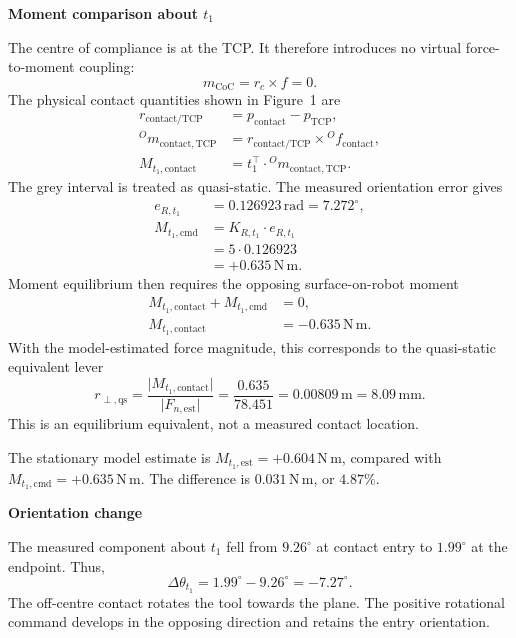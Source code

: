 \documentclass[11pt,a4paper]{article}
\begin{document}
\par\smallskip
\noindent\textbf{Moment comparison about \(t_1\)}\par
The centre of compliance is at the TCP.  It therefore introduces no virtual
force-to-moment coupling:
\[
 m_{\mathrm{CoC}}=r_c\times f=0.
\]
The physical contact quantities shown in Figure~1 are
\[
 \begin{aligned}
 r_{\mathrm{contact/TCP}}
 &=p_{\mathrm{contact}}-p_{\mathrm{TCP}},\\
 {}^{O}\!m_{\mathrm{contact},\mathrm{TCP}}
 &=r_{\mathrm{contact/TCP}}\times{}^{O}\!f_{\mathrm{contact}},\\
 M_{t_1,\mathrm{contact}}
 &=t_1^\top\mathbin{\cdot}{}^{O}\!m_{\mathrm{contact},\mathrm{TCP}}.
 \end{aligned}
\]
The grey interval is treated as quasi-static.  The measured orientation error
gives
\[
 \begin{aligned}
 e_{R,t_1}&=0.126923\,\mathrm{rad}=7.272^\circ,\\
 M_{t_1,\mathrm{cmd}}
 &=K_{R,t_1}\mathbin{\cdot}e_{R,t_1}\\
 &=5\mathbin{\cdot}0.126923\\
 &=+0.635\,\mathrm{N\,m}.
 \end{aligned}
\]
Moment equilibrium then requires the opposing surface-on-robot moment
\[
 \begin{aligned}
 M_{t_1,\mathrm{contact}}+M_{t_1,\mathrm{cmd}}&=0,\\
 M_{t_1,\mathrm{contact}}&=-0.635\,\mathrm{N\,m}.
 \end{aligned}
\]
With the model-estimated force magnitude, this corresponds to the
quasi-static equivalent lever
\[
 r_{\perp,\mathrm{qs}}
 =\frac{\lvert M_{t_1,\mathrm{contact}}\rvert}
 {\lvert F_{n,\mathrm{est}}\rvert}
 =\frac{0.635}{78.451}=0.00809\,\mathrm{m}=8.09\,\mathrm{mm}.
\]
This is an equilibrium equivalent, not a measured contact location.

The stationary model estimate is
\(M_{t_1,\mathrm{est}}=+0.604\,\mathrm{N\,m}\), compared with
\(M_{t_1,\mathrm{cmd}}=+0.635\,\mathrm{N\,m}\).  The difference is
\(0.031\,\mathrm{N\,m}\), or \(4.87\%\).

\par\smallskip
\noindent\textbf{Orientation change}\par
The measured component about \(t_1\) fell from \(9.26^\circ\) at contact entry
to \(1.99^\circ\) at the endpoint.  Thus,
\[
 \Delta\theta_{t_1}=1.99^\circ-9.26^\circ=-7.27^\circ.
\]
The off-centre contact rotates the tool towards the plane.  The positive
rotational command develops in the opposing direction and retains the entry
orientation.
\end{document}

